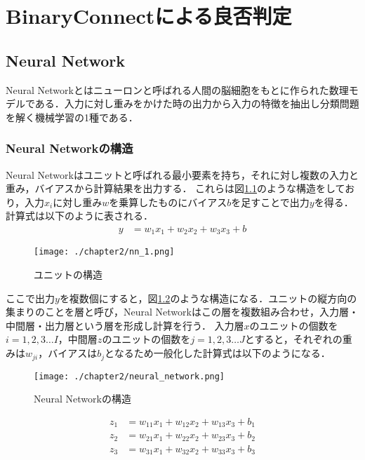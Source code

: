 

\chapter{BinaryConnectによる良否判定}

\section{Neural Network}
Neural Networkとはニューロンと呼ばれる人間の脳細胞をもとに作られた数理モデルである．入力に対し重みをかけた時の出力から入力の特徴を抽出し分類問題を解く機械学習の1種である．

\subsection{Neural Networkの構造}
Neural Networkはユニットと呼ばれる最小要素を持ち，それに対し複数の入力と重み，バイアスから計算結果を出力する．
これらは図\ref{fig_NN1}のような構造をしており，入力$x_i$に対し重み$w$を乗算したものにバイアス$b$を足すことで出力$y$を得る．計算式は以下のように表される．
\begin{align*}
y &= w_{1}x_{1} + w_{2}x_{2} + w_{3}x_{3} + b
\end{align*}
\begin{figure}[]
  \begin{center}
    \texttt{[image: ./chapter2/nn\_1.png]}
    \caption{ユニットの構造}
    \label{fig_NN1}
  \end{center}
\end{figure}

ここで出力$y$を複数個にすると，図\ref{fig_NN}のような構造になる．ユニットの縦方向の集まりのことを層と呼び，Neural Networkはこの層を複数組み合わせ，入力層・中間層・出力層という層を形成し計算を行う．
入力層$x$のユニットの個数を$i=1,2,3\ldots I$，中間層$z$のユニットの個数を$j=1,2,3\ldots J$とすると，それぞれの重みは$w_{ji}$，バイアスは$b_j$となるため一般化した計算式は以下のようになる．
\begin{figure}[]
  \begin{center}
    \texttt{[image: ./chapter2/neural\_network.png]}
    \caption{Neural Networkの構造}
    \label{fig_NN}
  \end{center}
\end{figure}

\begin{align*}
z_{1} &= w_{11}x_{1} + w_{12}x_{2} + w_{13}x_{3} + b_1\\
z_{2} &= w_{21}x_{1} + w_{22}x_{2} + w_{23}x_{3} + b_2\\
z_{3} &= w_{31}x_{1} + w_{32}x_{2} + w_{33}x_{3} + b_3
\end{align*}

